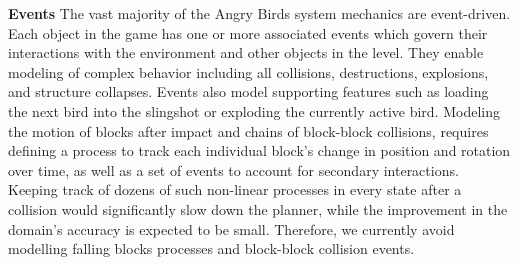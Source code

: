 \documentclass[letterpaper]{article} %
\begin{document}



\noindent\textbf{Events}
The vast majority of the Angry Birds system mechanics are event-driven.
Each object in the game has one or more associated events which govern their interactions with the environment and other objects in the level.
They enable modeling of complex behavior including all collisions, destructions, explosions, and structure collapses. Events also model supporting features such as loading the next bird into the slingshot or exploding the currently active bird.
Modeling the motion of blocks after impact and chains of block-block collisions, requires defining a process to track each individual block's change in position and rotation over time, as well as a set of events to account for secondary interactions.
Keeping track of dozens of such non-linear processes in every state after a collision would significantly slow down the planner, while the improvement in the domain's accuracy is expected to be small.
Therefore, we currently avoid modelling falling blocks processes and block-block collision events. %
\end{document}

